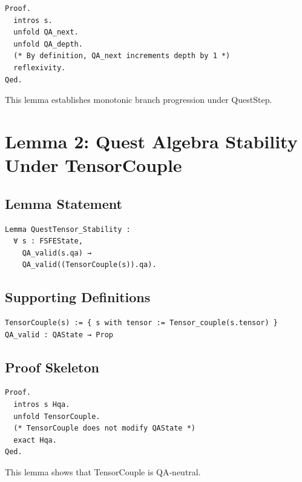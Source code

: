 \documentclass[11pt]{article}
\begin{document}
\begin{verbatim}
Proof.
  intros s.
  unfold QA_next.
  unfold QA_depth.
  (* By definition, QA_next increments depth by 1 *)
  reflexivity.
Qed.
\end{verbatim}

This lemma establishes monotonic branch progression under QuestStep.

\newpage


\section{Lemma 2: Quest Algebra Stability Under TensorCouple}

\subsection{Lemma Statement}

\begin{verbatim}
Lemma QuestTensor_Stability :
  ∀ s : FSFEState,
    QA_valid(s.qa) →
    QA_valid((TensorCouple(s)).qa).
\end{verbatim}

\subsection{Supporting Definitions}

\begin{verbatim}
TensorCouple(s) := { s with tensor := Tensor_couple(s.tensor) }
QA_valid : QAState → Prop
\end{verbatim}

\subsection{Proof Skeleton}

\begin{verbatim}
Proof.
  intros s Hqa.
  unfold TensorCouple.
  (* TensorCouple does not modify QAState *)
  exact Hqa.
Qed.
\end{verbatim}

This lemma shows that TensorCouple is QA‑neutral.

\newpage

\end{document}
